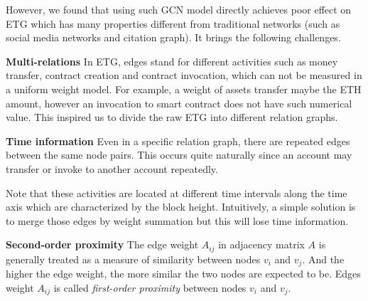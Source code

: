 However, we found that using such GCN model directly achieves poor effect on ETG which has many properties different from traditional networks (such as social media networks and citation graph). It brings the following challenges.


\textbf{Multi-relations} In ETG, edges stand for different activities such as money transfer, contract creation and contract invocation, which can not be measured in a uniform weight model. For example, a weight of assets transfer maybe the ETH amount, however an invocation to smart contract does not have such numerical value. This inspired us to divide the raw ETG into different relation graphs.



\textbf{Time information} Even in a specific relation graph, there are repeated edges between the same node pairs. This occurs quite naturally since an account may transfer or invoke to another account repeatedly.

Note that these activities are located at different time intervals along the time axis which are characterized by the block height. Intuitively, a simple solution is to merge those edges by weight summation but this will lose time information. 

\textbf{Second-order proximity} The edge weight $A_{ij}$ in adjacency matrix $A$ is generally treated as a measure of similarity between nodes $v_i$ and $v_j$. And the higher the edge weight, the more similar the two nodes are expected to be. Edges weight $A_{ij}$ is called \emph{first-order proximity} between nodes $v_i$ and $v_j$. 

